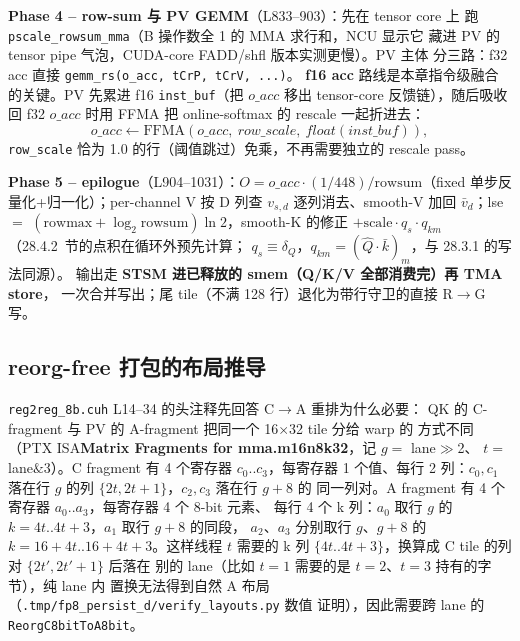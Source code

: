 \textbf{Phase 4 -- row-sum 与 PV GEMM}（L833--903）：先在 tensor core 上
跑 \texttt{pscale\_rowsum\_mma}（B 操作数全 1 的 MMA 求行和，NCU 显示它
藏进 PV 的 tensor pipe 气泡，CUDA-core FADD/shfl 版本实测更慢）。PV 主体
分三路：f32 acc 直接 \texttt{gemm\_rs(o\_acc, tCrP, tCrV, ...)}。
\textbf{f16 acc} 路线是本章指令级融合的关键。PV 先累进 f16
\texttt{inst\_buf}（把 $o\_acc$ 移出 tensor-core 反馈链），随后吸收回
f32 $o\_acc$ 时用 FFMA 把 online-softmax 的 rescale 一起折进去：
\begin{equation}
  o\_acc \leftarrow \mathrm{FFMA}(o\_acc,\ row\_scale,\ float(inst\_buf)),
\end{equation}
\texttt{row\_scale} 恰为 1.0 的行（阈值跳过）免乘，不再需要独立的 rescale pass。

\textbf{Phase 5 -- epilogue}（L904--1031）：$O = o\_acc\cdot(1/448)/
\mathrm{rowsum}$（fixed 单步反量化+归一化）；per-channel V 按 D 列查
$v_{s,d}$ 逐列消去、smooth-V 加回 $\bar v_d$；lse $=$
$(\mathrm{rowmax}+\log_2\mathrm{rowsum})\ln2$，smooth-K 的修正
$+\mathrm{scale}\cdot q_s\cdot q_{km}$（28.4.2~节的点积在循环外预先计算；
$q_s \equiv \delta_Q$，$q_{km} = (\hat Q\cdot\bar k)_m$，与 28.3.1 的写法同源）。
输出走 \textbf{STSM 进已释放的 smem（Q/K/V 全部消费完）再 TMA store}，
一次合并写出；尾 tile（不满 128 行）退化为带行守卫的直接 R$\to$G 写。

\subsection{reorg-free 打包的布局推导}

\texttt{reg2reg\_8b.cuh} L14--34 的头注释先回答 C$\to$A 重排为什么必要：
QK 的 C-fragment 与 PV 的 A-fragment 把同一个 16$\times$32 tile 分给 warp 的
方式不同（PTX ISA\textbf{Matrix Fragments for mma.m16n8k32}，记 $g=$ lane$\gg$2、
$t=$ lane$\&$3）。C fragment 有 4 个寄存器 $c_0..c_3$，每寄存器 1 个值、每行
2 列：$c_0,c_1$ 落在行 $g$ 的列 $\{2t,2t{+}1\}$，$c_2,c_3$ 落在行 $g{+}8$ 的
同一列对。A fragment 有 4 个寄存器 $a_0..a_3$，每寄存器 4 个 8-bit 元素、
每行 4 个 k 列：$a_0$ 取行 $g$ 的 $k=4t..4t{+}3$，$a_1$ 取行 $g{+}8$ 的同段，
$a_2$、$a_3$ 分别取行 $g$、$g{+}8$ 的 $k=16{+}4t..16{+}4t{+}3$。这样线程 $t$
需要的 k 列 $\{4t..4t{+}3\}$，换算成 C tile 的列对 $\{2t',2t'{+}1\}$ 后落在
别的 lane（比如 $t{=}1$ 需要的是 $t{=}2$、$t{=}3$ 持有的字节），纯 lane 内
置换无法得到自然 A 布局（\texttt{.tmp/fp8\_persist\_d/verify\_layouts.py} 数值
证明），因此需要跨 lane 的 \texttt{ReorgC8bitToA8bit}。


